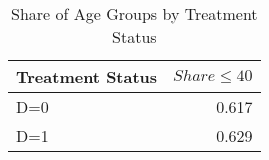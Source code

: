 \begin{table}[!h]
\centering
\caption{Share of Age Groups by Treatment Status}
\centering
\begin{tabular}[t]{lr}
\toprule
Treatment Status & $Share \leq 40$\\
\midrule
D=0 & 0.617\\
D=1 & 0.629\\
\bottomrule
\end{tabular}
\end{table}
